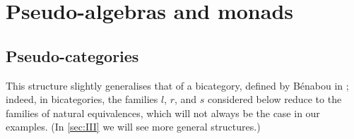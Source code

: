 \documentclass[fleqn]{article}
\newcommand{\oldpage}[1]{\marginpar{\footnotesize$\Big\vert$ \textit{p.~#1}}}
\begin{document}
\section{Pseudo-algebras and monads}
\label{sec:II}

\subsection{Pseudo-categories}
\label{sec:II.1}
\oldpage{243}

This structure slightly generalises that of a bicategory, defined by Bénabou in \cite{Be};
indeed, in bicategories, the families $l$, $r$, and $s$ considered below reduce to the families of natural equivalences, which will not always be the case in our examples.
(In \cref{sec:III} we will see more general structures.)
\end{document}
